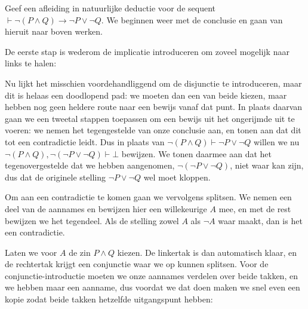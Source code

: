 \begin{example}\label{ex:nd:demorgan}
  Geef een afleiding in natuurlijke deductie voor de sequent $\vdash \neg (P \land Q) \to \neg P \lor \neg Q$. We beginnen weer met de conclusie en gaan van hieruit naar boven werken.

\begin{prooftree}
\end{prooftree}

De eerste stap is wederom de implicatie introduceren om zoveel mogelijk naar links te halen:
\begin{prooftree}
\end{prooftree}

Nu lijkt het misschien voordehandliggend om de disjunctie te introduceren, maar dit is helaas een doodlopend pad: we moeten dan een van beide kiezen, maar hebben nog geen heldere route naar een bewijs vanaf dat punt. In plaats daarvan gaan we een tweetal stappen toepassen om een bewijs uit het ongerijmde uit te voeren: we nemen het tegengestelde van onze conclusie aan, en tonen aan dat dit tot een contradictie leidt. Dus in plaats van $\neg (P \land Q) \vdash \neg P \lor \neg Q$ willen we nu $\neg (P \land Q), \neg (\neg P \lor \neg Q) \vdash \bot$ bewijzen. We tonen daarmee aan dat het tegenovergestelde dat we hebben aangenomen, $\neg (\neg P \lor \neg Q)$, niet waar kan zijn, dus dat de originele stelling $\neg P \lor \neg Q$ wel moet kloppen.

Om aan een contradictie te komen gaan we vervolgens splitsen. We nemen een deel van de aannames en bewijzen hier een willekeurige $A$ mee, en met de rest bewijzen we het tegendeel. Als de stelling zowel $A$ als $\neg A$ waar maakt, dan is het een contradictie.

\begin{prooftree}

\end{prooftree}

Laten we voor $A$ de zin $P \land Q$ kiezen. De linkertak is dan automatisch klaar, en de rechtertak krijgt een conjunctie waar we op kunnen splitsen. Voor de conjunctie-introductie moeten we onze aannames verdelen over beide takken, en we hebben maar een aanname, dus voordat we dat doen maken we snel even een kopie zodat beide takken hetzelfde uitgangspunt hebben:


\end{example}
